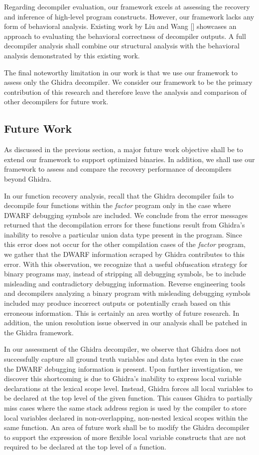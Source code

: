 \documentclass[conference]{IEEEtran}
\begin{document}
Regarding decompiler evaluation, our framework excels at assessing the recovery and inference of high-level program constructs. However, our framework lacks any form of behavioral analysis. Existing work by Liu and Wang [] showcases an approach to evaluating the behavioral correctness of decompiler outputs. A full decompiler analysis shall combine our structural analysis with the behavioral analysis demonstrated by this existing work.

The final noteworthy limitation in our work is that we use our framework to assess only the Ghidra decompiler. We consider our framework to be the primary contribution of this research and therefore leave the analysis and comparison of other decompilers for future work.

\subsection{Future Work}

As discussed in the previous section, a major future work objective shall be to extend our framework to support optimized binaries. In addition, we shall use our framework to assess and compare the recovery performance of decompilers beyond Ghidra.

In our function recovery analysis, recall that the Ghidra decompiler fails to decompile four functions within the \emph{factor} program only in the case where DWARF debugging symbols are included. We conclude from the error messages returned that the decompilation errors for these functions result from Ghidra's inability to resolve a particular union data type present in the program. Since this error does not occur for the other compilation cases of the \emph{factor} program, we gather that the DWARF information scraped by Ghidra contributes to this error. With this observation, we recognize that a useful obfuscation strategy for binary programs may, instead of stripping all debugging symbols, be to include misleading and contradictory debugging information. Reverse engineering tools and decompilers analyzing a binary program with misleading debugging symbols included may produce incorrect outputs or potentially crash based on this erroneous information. This is certainly an area worthy of future research. In addition, the union resolution issue observed in our analysis shall be patched in the Ghidra framework.

In our assessment of the Ghidra decompiler, we observe that Ghidra does not successfully capture all ground truth variables and data bytes even in the case the DWARF debugging information is present. Upon further investigation, we discover this shortcoming is due to Ghidra's inability to express local variable declarations at the lexical scope level. Instead, Ghidra forces all local variables to be declared at the top level of the given function. This causes Ghidra to partially miss cases where the same stack address region is used by the compiler to store local variables declared in non-overlapping, non-nested lexical scopes within the same function. An area of future work shall be to modify the Ghidra decompiler to support the expression of more flexible local variable constructs that are not required to be declared at the top level of a function.
\end{document}

